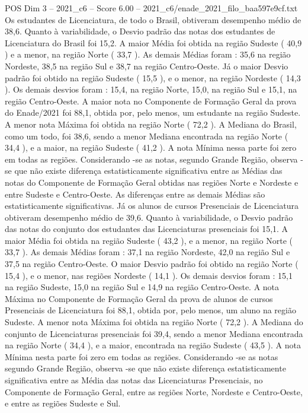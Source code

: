 \begin{textsample}{POS Dim 3 – 2021\_c6 – Score 6.00 – 2021\_c6/enade\_2021\_filo\_baa597e9cf.txt}
Os estudantes de Licenciatura, de todo o Brasil, obtiveram desempenho médio de 38,6.
Quanto à variabilidade, o Desvio padrão das notas dos estudantes de Licenciatura do Brasil foi 15,2.
A maior Média foi obtida na região Sudeste ( 40,9 ) e a menor, na região Norte ( 33,7 ).
As demais Médias foram : 35,6 na região Nordeste, 38,5 na região Sul e 38,7 na região Centro-Oeste.
Já o maior Desvio padrão foi obtido na região Sudeste ( 15,5 ), e o menor, na região Nordeste ( 14,3 ).
Os demais desvios foram : 15,4, na região Norte, 15,0, na região Sul e 15,1, na região Centro-Oeste.
A maior nota no Componente de Formação Geral da prova do Enade/2021 foi 88,1, obtida por, pelo menos, um estudante na região Sudeste.
A menor nota Máxima foi obtida na região Norte ( 72,2 ).
A Mediana do Brasil, como um todo, foi 38,6, sendo a menor Mediana encontrada na região Norte ( 34,4 ), e a maior, na região Sudeste ( 41,2 ).
A nota Mínima nessa parte foi zero em todas as regiões.
Considerando -se as notas, segundo Grande Região, observa -se que não existe diferença estatisticamente significativa entre as Médias das notas do Componente de Formação Geral obtidas nas regiões Norte e Nordeste e entre Sudeste e Centro-Oeste.
As diferenças entre as demais Médias são estatisticamente significativas.
Já os alunos de cursos Presenciais de Licenciatura obtiveram desempenho médio de 39,6.
Quanto à variabilidade, o Desvio padrão das notas do conjunto dos estudantes das Licenciaturas presenciais foi 15,1.
A maior Média foi obtida na região Sudeste ( 43,2 ), e a menor, na região Norte ( 33,7 ).
As demais Médias foram : 37,1 na região Nordeste, 42,0 na região Sul e 37,5 na região Centro-Oeste.
O maior Desvio padrão foi obtido na região Norte ( 15,4 ), e o menor, nas regiões Nordeste ( 14,1 ).
Os demais desvios foram : 15,1 na região Sudeste, 15,0 na região Sul e 14,9 na região Centro-Oeste.
A nota Máxima no Componente de Formação Geral da prova de alunos de cursos Presenciais de Licenciatura foi 88,1, obtida por, pelo menos, um aluno na região Sudeste.
A menor nota Máxima foi obtida na região Norte ( 72,2 ).
A Mediana do conjunto de Licenciaturas presenciais foi 39,4, sendo a menor Mediana encontrada na região Norte ( 34,4 ), e a maior, encontrada na região Sudeste ( 43,5 ).
A nota Mínima nesta parte foi zero em todas as regiões.
Considerando -se as notas segundo Grande Região, observa -se que não existe diferença estatisticamente significativa entre as Média das notas das Licenciaturas Presenciais, no Componente de Formação Geral, entre as regiões Norte, Nordeste e Centro-Oeste, e entre as regiões Sudeste e Sul.

\end{textsample}
